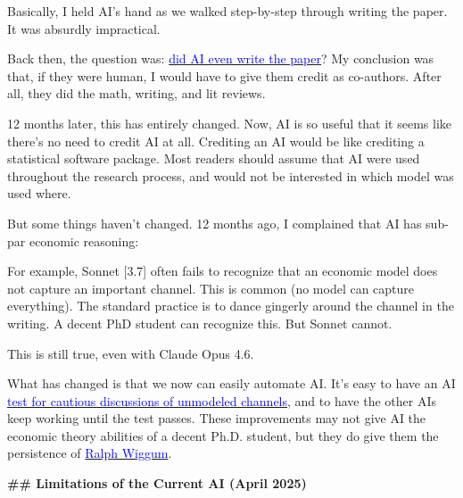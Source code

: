\documentclass[12pt]{article}
\begin{document}
\begin{mdframed}[
linewidth=1pt,
linecolor=black,
innerleftmargin=0.25em,
innerrightmargin=0.25em,
innertopmargin=0.2\baselineskip,
innerbottommargin=0.8\baselineskip
]
Basically, I held AI's hand as we walked step-by-step through writing the paper. It was absurdly impractical.

Back then, the question was: \href{https://github.com/redacted/Prompts-to-Paper?tab=readme-ov-file#the-paper-generation-process}{\textcolor{blue}{did AI even write the paper}}? My conclusion was that, if they were human, I would have to give them credit as co-authors. After all, they did the math, writing, and lit reviews.

12 months later, this has entirely changed. Now, AI is so useful that it seems like there's no need to credit AI at all. Crediting an AI would be like crediting a statistical software package. Most readers should assume that AI were used throughout the research process, and would not be interested in which model was used where.

But some things haven't changed. 12 months ago, I complained that AI has sub-par economic reasoning:

\begin{tcolorbox}[enhanced,breakable,colback=white,boxrule=0pt,frame hidden,sharp corners,left=0.9em,right=0em,top=0.15em,bottom=0.15em,before skip=0.75\baselineskip,after skip=0.6\baselineskip,borderline west={2pt}{0pt}{blue!45!black}]
\setlength{\parskip}{0.3em}
For example, Sonnet [3.7] often fails to recognize that an economic model does not capture an important channel. This is common (no model can capture everything). The standard practice is to dance gingerly around the channel in the writing. A decent PhD student can recognize this. But Sonnet cannot.
\end{tcolorbox}

This is still true, even with Claude Opus 4.6.

What has changed is that we now can easily automate AI. It's easy to have an AI \href{https://github.com/redacted/ralph-wiggum-asset-pricing/blob/main/tests/theory-unmodeled-channels.py}{\textcolor{blue}{test for cautious discussions of unmodeled channels}}, and to have the other AIs keep working until the test passes. These improvements may not give AI the economic theory abilities of a decent Ph.D. student, but they do give them the persistence of \href{https://en.wikipedia.org/wiki/Ralph_Wiggum}{\textcolor{blue}{Ralph Wiggum}}.

\par
{\large\bfseries \textcolor{red!70!black}{\#\# Limitations of the Current AI (April 2025)}}
\par


\end{mdframed}
\end{document}
